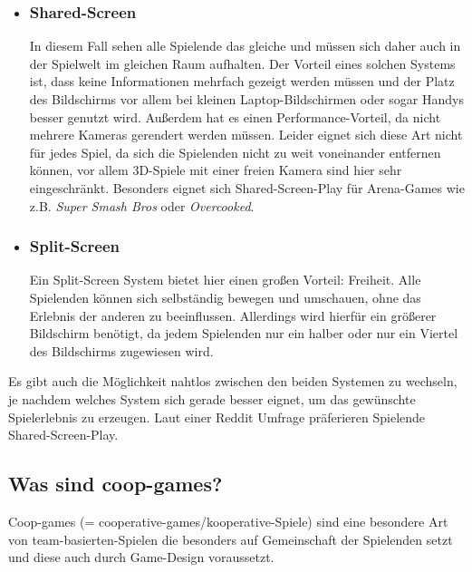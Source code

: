 \begin{itemize}
	
\item \subsubsection{Shared-Screen}

In diesem Fall sehen alle Spielende das gleiche und müssen sich daher auch in der Spielwelt im gleichen Raum aufhalten. Der Vorteil eines solchen Systems ist, dass keine Informationen mehrfach gezeigt werden müssen und der Platz des Bildschirms vor allem bei kleinen Laptop-Bildschirmen oder sogar Handys besser genutzt wird. Außerdem hat es einen Performance-Vorteil, da nicht mehrere Kameras gerendert werden müssen. Leider eignet sich diese Art nicht für jedes Spiel, da sich die Spielenden nicht zu weit voneinander entfernen können, vor allem 3D-Spiele mit einer freien Kamera sind hier sehr eingeschränkt. Besonders eignet sich Shared-Screen-Play für Arena-Games wie z.B. \emph{Super Smash Bros} oder \emph{Overcooked}.

\item \subsubsection{Split-Screen}

Ein Split-Screen System bietet hier einen großen Vorteil: Freiheit. Alle Spielenden können sich selbständig bewegen und umschauen, ohne das Erlebnis der anderen zu beeinflussen. Allerdings wird hierfür ein größerer Bildschirm benötigt, da jedem Spielenden nur ein halber oder nur ein Viertel des Bildschirms zugewiesen wird.

\end{itemize}

\noindent Es gibt auch die Möglichkeit nahtlos zwischen den beiden Systemen zu wechseln, je nachdem welches System sich gerade besser eignet, um das gewünschte Spielerlebnis zu erzeugen. Laut einer Reddit Umfrage präferieren Spielende Shared-Screen-Play\cite{_shared_or_splitscreen_preference}.

\subsection{Was sind coop-games?}

Coop-games (= cooperative-games/kooperative-Spiele) sind eine besondere Art von team-basierten-Spielen die besonders auf Gemeinschaft der Spielenden setzt und diese auch durch Game-Design voraussetzt. 

